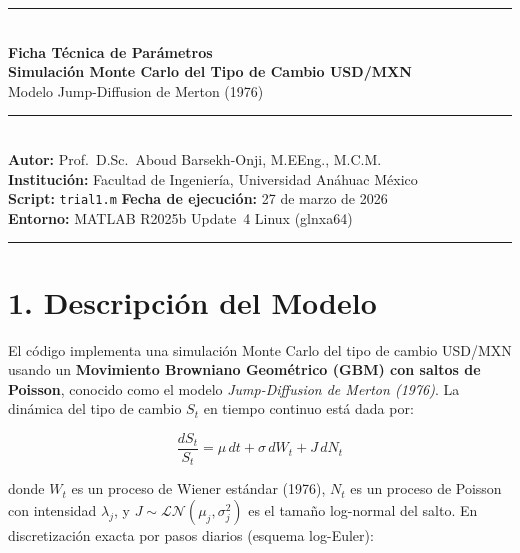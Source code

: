 \documentclass[11pt,letterpaper]{article}
\begin{document}

\begin{center}
    {\color{anahuac}\rule{\linewidth}{2pt}}\\[0.4cm]
    {\LARGE\bfseries\color{anahuac}
        Ficha Técnica de Parámetros}\\[0.25cm]
    {\large\bfseries Simulación Monte Carlo del Tipo de Cambio USD/MXN}\\[0.2cm]
    {\large Modelo Jump-Diffusion de Merton (1976)}\\[0.35cm]
    {\color{anahuac}\rule{\linewidth}{1pt}}\\[0.3cm]
    {\normalsize
        \textbf{Autor:} Prof.~D.Sc.~Aboud Barsekh-Onji, M.EEng., M.C.M.\\[0.1cm]
        \textbf{Institución:} Facultad de Ingeniería, Universidad Anáhuac México\\[0.1cm]
        \textbf{Script:} \texttt{trial1.m} \quad
        \textbf{Fecha de ejecución:} 27 de marzo de 2026\\[0.1cm]
        \textbf{Entorno:} MATLAB R2025b Update~4 \textbar{} Linux (glnxa64)
    }\\[0.3cm]
    {\color{anahuac}\rule{\linewidth}{0.5pt}}
\end{center}

\vspace{0.3cm}

\section*{1. Descripción del Modelo}

El código implementa una simulación Monte Carlo del tipo de cambio USD/MXN
usando un \textbf{Movimiento Browniano Geométrico (GBM) con saltos de
Poisson}, conocido como el modelo \textit{Jump-Diffusion de Merton (1976)}.
La dinámica del tipo de cambio $S_t$ en tiempo continuo está dada por:

\begin{equation}
    \frac{dS_t}{S_t} = \mu\,dt + \sigma\,dW_t + J\,dN_t
    \label{eq:sde}
\end{equation}

donde $W_t$ es un proceso de Wiener estándar (1976), $N_t$ es un proceso de Poisson
con intensidad $\lambda_j$, y $J \sim \mathcal{LN}(\mu_j, \sigma_j^2)$ es el
tamaño log-normal del salto.  En discretización exacta por pasos diarios
(esquema log-Euler):
\end{document}
